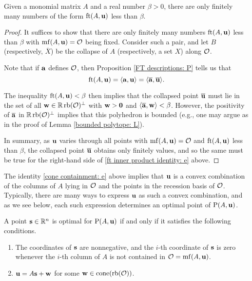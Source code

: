 \documentclass[11pt]{amsart}
\renewcommand{\!}[1]{{\color{red}\text{$\star$\,}#1\,$\star$}}
\newcommand{\ol}[1]{\overline{#1}}
\begin{document}
\begin{lemma}
\label{discreteness of F-thresholds: L}
Given a monomial matrix $A$ and a real number $\beta > 0 $, there are only finitely many numbers of the form $\operatorname{ft}(A, \mathbf{u})$ less than $\beta$.    
\end{lemma}

\begin{proof}   
It suffices to show that there are only finitely many numbers $\operatorname{ft}(A, \mathbf{u})$ less than $\beta$ with $\operatorname{mf}(A, \mathbf{u}) = \mathcal{O}$ being fixed.   Consider such a pair, and let $B$ (respectively, $\ol{X}$) be the collapse of $A$ (respectively,  a set $X$) along $\mathcal{O}$.

Note that if $\mathbf{a}$ defines $\mathcal{O}$, then Proposition \ref{FT descriptions: P} tells us that 
%
\begin{equation} 
\label{ft inner product identity: e}
\ft{A}{\vv{u}} = \iprod{\vv{a}}{\vv{u}} = \iprod{\ol{\vv{a}}}{\ol{\vv{u}}}. 
\end{equation}
% 

The inequality $\operatorname{ft}(A, \mathbf{u}) < \beta$ then implies that the collapsed point $\ol{\vv{u}}$ must lie in the set of all $\mathbf{w} \in \mathbb{R} \operatorname{rb}(\mathcal{O})^{\perp}$ with $\mathbf{w} > \mathbf{0}$ and $\iprod{\ol{\vv{a}}}{\vv{w}} < \beta$.  However, the positivity of $\ol{\vv{a}}$ in $\mathbb{R} \operatorname{rb}(\mathcal{O})^{\perp}$ implies that this polyhedron is bounded (e.g., one may argue as in the proof of Lemma \ref{bounded polytope: L}).  

In summary, as $\mathbf{u}$ varies through all points with  $\operatorname{mf}(A, \mathbf{u}) = \mathcal{O}$ and $\operatorname{ft}(A, \mathbf{u})$ less than $\beta$, the collapsed point $\ol{\vv{u}}$ obtains only finitely values, and so the same must be true for the right-hand side of \eqref{ft inner product identity: e} above.
\end{proof}


The identity \eqref{cone containment: e} above implies that 
$\mathbf{u}$ is a convex combination of the columns of $A$ lying in $\mathcal{O}$ and the points in the recession basis of $\mathcal{O}$.  Typically, there are many ways to express $\mathbf{u}$ as such a convex combination, and as we see below, each such expression determines an optimal point of $\mathrm{P}(A, \mathbf{u})$.

\begin{corollary}  
\label{opt set: C}
A point $\mathbf{s} \in \mathbb{R}^n$ is optimal for $\mathrm{P}(A, \mathbf{u})$ if and only if it satisfies the following conditions.
\begin{enumerate}
\item  \label{mc coords: e} The coordinates of $\mathbf{s}$ are nonnegative, and the $i$-th coordinate of $\mathbf{s}$ is zero whenever the $i$-th column of $A$ is not contained in $\mathcal{O} = \operatorname{mf}(A, \mathbf{u})$.
\item  \label{mc decomposition: e} $\mathbf{u} = A \mathbf{s} + \mathbf{w}$ for some $\mathbf{w} \in  \operatorname{cone}(\operatorname{rb}(\mathcal{O}))$.   
\end{enumerate}
\end{corollary}
\end{document}

